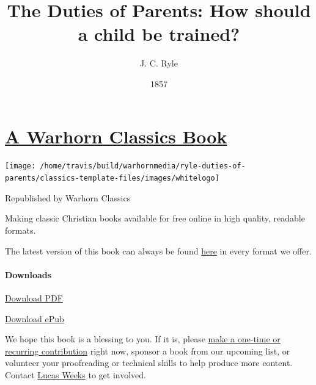 \documentclass[
]{book}
\title{The Duties of Parents: How should a child be trained?}
\author{J. C. Ryle}
\date{1857}
\begin{document}
\maketitle

\mainmatter

{
\setcounter{tocdepth}{1}
\tableofcontents
}
\hypertarget{a-warhorn-classics-book}{%
\chapter*{\texorpdfstring{\href{https://classics.warhornmedia.com/}{A Warhorn Classics Book}}{A Warhorn Classics Book}}\label{a-warhorn-classics-book}}

\begin{center}\texttt{[image: /home/travis/build/warhornmedia/ryle-duties-of-parents/classics-template-files/images/whitelogo]} \end{center}

\begin{center}

Republished by Warhorn Classics

\end{center}

Making classic Christian books available for free online in high quality, readable formats.

The latest version of this book can always be found \href{https://warhornmedia.github.io/ryle-duties-of-parents}{here} in every format we offer.

\hypertarget{downloads}{%
\subsubsection*{Downloads}\label{downloads}}

\href{https://warhornmedia.github.io/ryle-duties-of-parents/Ryle-Duties_of_Parents.pdf}{Download PDF}

\href{https://warhornmedia.github.io/ryle-duties-of-parents/Ryle-Duties_of_Parents.epub}{Download ePub}

We hope this book is a blessing to you. If it is, please \href{https://warhornmedia.com/give}{make a one-time or recurring contribution} right now, sponsor a book from our upcoming list, or volunteer your proofreading or technical skills to help produce more content. Contact \href{mailto:lucas@beggarsborn.com}{Lucas Weeks} to get involved.
\end{document}
